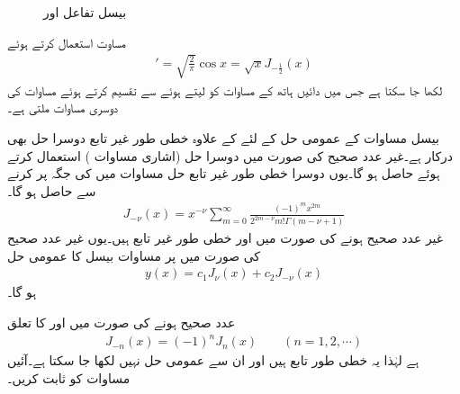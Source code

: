 %
\begin{figure}
\centering
{}
\caption{بیسل تفاعل  اور }
\label{شکل_بیسل_کسری_بیسل}
\end{figure}

مساوت  استعمال کرتے ہوئے
\begin{align*}
[\sqrt{x}J_{\tfrac{1}{2}}(x)]'=\sqrt{\frac{2}{\pi}}\cos x=\sqrt{x}J_{-\tfrac{1}{2}}(x)
\end{align*} 
لکھا جا سکتا ہے جس میں دائیں ہاتھ کے مساوات کو لیتے ہوئے  سے تقسیم کرتے ہوئے مساوات  کی دوسری مساوات ملتی ہے۔

بیسل مساوات  کے عمومی حل کے لئے  کے علاوہ خطی طور غیر تابع دوسرا حل بھی درکار ہے۔غیر عدد صحیح  کی صورت میں دوسرا حل   (اشاری مساوات ) استعمال کرتے ہوئے حاصل ہو گا۔یوں دوسرا خطی طور غیر تابع حل مساوات  میں  کی جگہ  پر کرنے سے حاصل ہو گا۔
\begin{align}\label{مساوات_بیسل_تسلسل_عمومی_دوسرا}
J_{-\nu}(x)=x^{-\nu}\sum_{m=0}^{\infty}\frac{(-1)^m x^{2m}}{2^{2m-\nu}m!\Gamma(m-\nu+1)}
\end{align}
 غیر عدد صحیح ہونے کی صورت میں  اور  خطی طور غیر تابع ہیں۔یوں غیر عدد صحیح  کی صورت میں  پر  مساوات بیسل کا عمومی حل 
\begin{align}
y(x)=c_1J_{\nu}(x)+c_2J_{-\nu}(x)
\end{align}
ہو گا۔ 

 عدد صحیح ہونے کی صورت میں  اور  کا تعلق
\begin{align}\label{مساوات_بیسل_عدد_صحیح_بیسل_تعلق}
J_{-n}(x)=(-1)^nJ_n(x) \quad \quad (n=1,2,\cdots)
\end{align}
ہے لہٰذا یہ خطی طور تابع ہیں اور ان سے عمومی حل نہیں لکھا جا سکتا ہے۔آئیں مساوات  کو ثابت کریں۔

